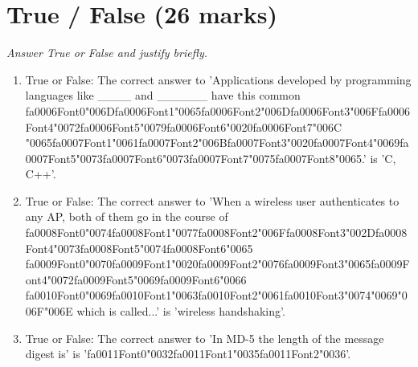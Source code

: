 \documentclass[12pt]{article}
\begin{document}
\section*{True / False (26 marks)}
\textit{Answer True or False and justify briefly.}
\begin{enumerate}[label=\arabic*.]
\item True or False: The correct answer to 'Applications developed by programming languages like \_\_\_\_ and \_\_\_\_\_\_ have this common {\csname fa0006Font0\endcsname\char"006D}{\csname fa0006Font1\endcsname\char"0065}{\csname fa0006Font2\endcsname\char"006D}{\csname fa0006Font3\endcsname\char"006F}{\csname fa0006Font4\endcsname\char"0072}{\csname fa0006Font5\endcsname\char"0079}{\csname fa0006Font6\endcsname\char"0020}{\csname fa0006Font7\endcsname\char"006C} {\char"0065}{\csname fa0007Font1\endcsname\char"0061}{\csname fa0007Font2\endcsname\char"006B}{\csname fa0007Font3\endcsname\char"0020}{\csname fa0007Font4\endcsname\char"0069}{\csname fa0007Font5\endcsname\char"0073}{\csname fa0007Font6\endcsname\char"0073}{\csname fa0007Font7\endcsname\char"0075}{\csname fa0007Font8\endcsname\char"0065}.' is 'C, C++'.
\item True or False: The correct answer to 'When a wireless user authenticates to any AP, both of them go in the course of {\csname fa0008Font0\endcsname\char"0074}{\csname fa0008Font1\endcsname\char"0077}{\csname fa0008Font2\endcsname\char"006F}{\csname fa0008Font3\endcsname\char"002D}{\csname fa0008Font4\endcsname\char"0073}{\csname fa0008Font5\endcsname\char"0074}{\csname fa0008Font6\endcsname\char"0065} {\csname fa0009Font0\endcsname\char"0070}{\csname fa0009Font1\endcsname\char"0020}{\csname fa0009Font2\endcsname\char"0076}{\csname fa0009Font3\endcsname\char"0065}{\csname fa0009Font4\endcsname\char"0072}{\csname fa0009Font5\endcsname\char"0069}{\csname fa0009Font6\endcsname\char"0066} {\csname fa0010Font0\endcsname\char"0069}{\csname fa0010Font1\endcsname\char"0063}{\csname fa0010Font2\endcsname\char"0061}{\csname fa0010Font3\endcsname\char"0074}{\char"0069}{\char"006F}{\char"006E} which is called...' is 'wireless handshaking'.
\item True or False: The correct answer to 'In MD-5 the length of the message digest is' is '{\csname fa0011Font0\endcsname\char"0032}{\csname fa0011Font1\endcsname\char"0035}{\csname fa0011Font2\endcsname\char"0036}'.

\end{enumerate}
\end{document}
